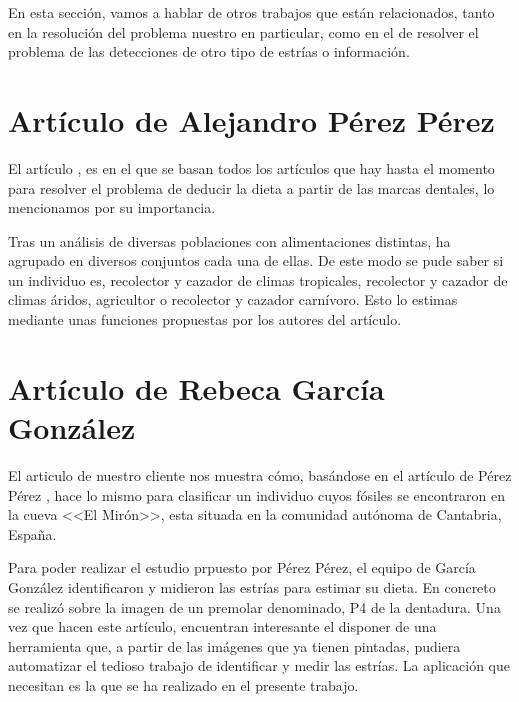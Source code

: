
En esta sección, vamos a hablar de otros trabajos que están relacionados, tanto en la resolución del problema nuestro en particular, como en el de resolver el problema de las detecciones de otro tipo de estrías o información.

\section{Artículo de Alejandro Pérez Pérez}
El artículo \cite{Lalueza:perez}, es en el que se basan todos los artículos que hay hasta el momento para resolver el problema de deducir la dieta a partir de las marcas dentales, lo mencionamos por su importancia.

Tras un análisis de diversas poblaciones con alimentaciones distintas, ha agrupado en diversos conjuntos cada una de ellas. De este modo se pude saber si un individuo es, recolector y cazador de climas tropicales, recolector y cazador de climas áridos, agricultor o recolector y cazador carnívoro.
Esto lo estimas mediante unas funciones propuestas por los autores del artículo.

\section{Artículo de Rebeca García González}

El articulo \cite{garcia2015dietary} de nuestro cliente nos muestra cómo, basándose en el artículo de Pérez Pérez \cite{Lalueza:perez}, hace lo mismo para clasificar un individuo cuyos fósiles se encontraron en la cueva <<El Mirón>>, esta situada en la comunidad autónoma de Cantabria, España.

Para poder realizar el estudio prpuesto por Pérez Pérez, el equipo de García González identificaron y midieron las estrías para estimar su dieta. En concreto se realizó sobre la imagen de un premolar denominado, P4 de la dentadura. 
Una vez que hacen este artículo, encuentran interesante el disponer de una herramienta que, a partir de las imágenes que ya tienen pintadas, pudiera automatizar el tedioso trabajo de identificar y medir las estrías. La aplicación que necesitan es la que se ha realizado en el presente trabajo.

